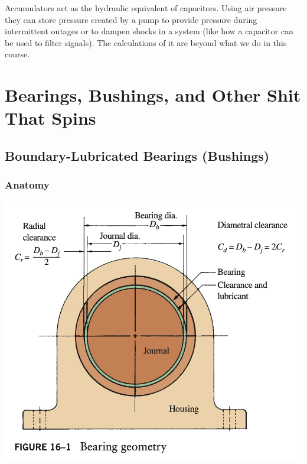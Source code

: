 \documentclass[11pt, fleqn]{article}
\begin{document}
Accumulators act as the hydraulic equivalent of capacitors. Using air pressure they can store pressure created by a pump to provide pressure during intermittent outages or to dampen shocks in a system (like how a capacitor can be used to filter signals). The calculations of it are beyond what we do in this course.


\section{Bearings, Bushings, and Other Shit That Spins}
\subsection{Boundary-Lubricated Bearings (Bushings)}
\subsubsection{Anatomy}
\includegraphics[scale=0.6]{Bearings/basic-bearing.png}
\end{document}
